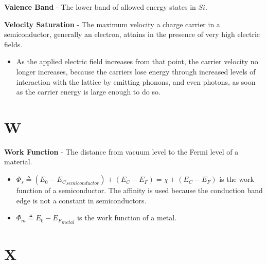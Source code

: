 \vspace{0.5cm}
\noindent
    \textbf{Valence Band} - The lower band of allowed energy states in $Si$.

\vspace{0.5cm}
\noindent
    \textbf{Velocity Saturation} - The maximum velocity a charge carrier in a semiconductor, generally an electron, attains in the presence of very high electric fields.
    \vspace{0.15cm}
    \begin{itemize}
        \setlength\itemsep{0.5em}
        \item{As the applied electric field increases from that point, the carrier velocity no longer increases, because the carriers lose energy through increased levels of interaction with the lattice by emitting phonons, and even photons, as soon as the carrier energy is large enough to do so.}
    \end{itemize}
\section{W}
    \textbf{Work Function} - The distance from vacuum level to the Fermi level of a material.
    \vspace{0.15cm}
    \begin{itemize}
        \setlength\itemsep{0.5em}
        \item{$\Phi_s \triangleq (E_0 - {E_C}_{semiconductor}) + (E_C - E_F) = \chi + (E_C - E_F)$ is the work function of a semiconductor.  The affinity is used because the conduction band edge is not a constant in semiconductors.}
        \item{$\Phi_m \triangleq E_0 - {E_F}_{metal}$ is the work function of a metal.}
    \end{itemize}
\section{X}
